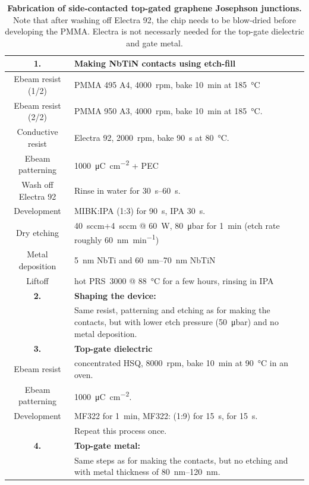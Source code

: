 \begin{table}
	\caption{
		\textbf{Fabrication of side-contacted top-gated graphene Josephson junctions.}
		Note that after washing off Electra 92, the chip needs to be blow-dried before developing the PMMA.
		Electra is not necessarly needed for the top-gate dielectric and gate metal.
	}
	\label{tab:fabgJJ}
\begin{tabularx}{\textwidth}{@{}cY@{}}
	\hline \hline
	\textbf{1.} & \textbf{Making NbTiN contacts using etch-fill} \\
	\hline
	Ebeam resist (1/2) & PMMA 495 A4, \SI{4000}{rpm}, bake \SI{10}{\minute} at \SI{185}{\celsius} \\
	Ebeam resist (2/2) & PMMA 950 A3, \SI{4000}{rpm}, bake \SI{10}{\minute} at \SI{185}{\celsius}. \\
	Conductive resist & Electra 92, \SI{2000}{rpm}, bake \SI{90}{\second} at \SI{80}{\celsius}. \\
	Ebeam patterning & \SI{1000}{\micro\coulomb\per\centi\meter\squared} + PEC \\
	Wash off Electra 92 & Rinse in water for \SIrange{30}{60}{\second}. \\
	Development & MIBK:IPA (1:3) for \SI{90}{\second}, IPA \SI{30}{\second}. \\
	Dry etching &  \SI{40}{sccm}+\SI{4}{sccm} @ \SI{60}{\watt}, \SI{80}{\micro\bar} for \SI{1}{\minute} (etch rate roughly \SI{60}{\nano\meter\per\minute}) \\
	Metal deposition & \SI{5}{\nano\meter} NbTi and \SIrange{60}{70}{\nano\meter} NbTiN \\
	Liftoff & hot PRS~3000 @ \SI{88}{\celsius} for a few hours, rinsing in IPA \\
	\hline
	\textbf{2.} & \textbf{Shaping the device:} \\
	\hline
	& Same resist, patterning and etching as for making the contacts, but with lower etch pressure (\SI{50}{\micro\bar}) and no metal deposition. \\
	\hline
	\textbf{3.} & \textbf{Top-gate dielectric} \\
	\hline
	Ebeam resist & concentrated HSQ, \SI{8000}{rpm}, bake \SI{10}{\minute} at \SI{90}{\celsius} in an oven. \\
	Ebeam patterning & \SI{1000}{\micro\coulomb\per\centi\meter\squared}. \\
	Development & MF322 for \SI{1}{\minute}, MF322: (1:9) for \SI{15}{\second},  for \SI{15}{\second}. \\
	& Repeat this process once. \\
	\hline 
	\textbf{4.} & \textbf{Top-gate metal: } \\
	\hline
	& Same steps as for making the contacts, but no etching and with metal thickness of \SIrange{80}{120}{\nano\meter}. \\
	\hline \hline
\end{tabularx}
\end{table}


